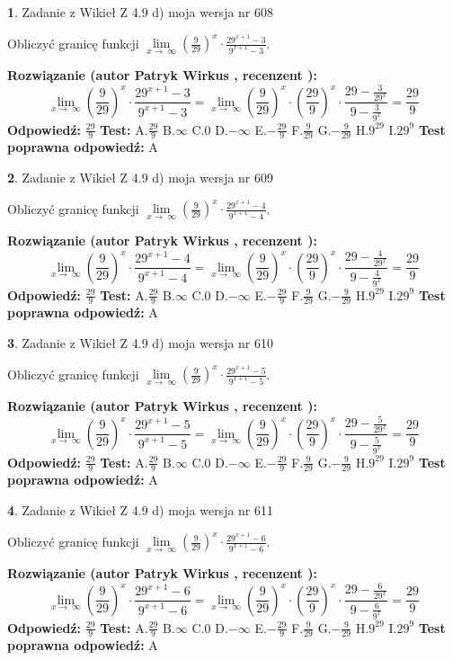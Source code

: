 \documentclass[12pt, a4paper]{article}
\theoremstyle{definition} %
\newtheorem{zad}{}
\newcommand{\zadStart}[1]{\begin{zad}#1\newline}
\newcommand{\zadStop}{\end{zad}}
\newcommand{\rozwStart}[2]{\noindent \textbf{Rozwiązanie (autor #1 , recenzent #2): }\newline}
\newcommand{\rozwStop}{\newline}
\newcommand{\odpStart}{\noindent \textbf{Odpowiedź:}\newline}
\newcommand{\odpStop}{\newline}
\newcommand{\testStart}{\noindent \textbf{Test:}\newline}
\newcommand{\testStop}{\newline}
\newcommand{\kluczStart}{\noindent \textbf{Test poprawna odpowiedź:}\newline}
\newcommand{\kluczStop}{\newline}
\begin{document}
\zadStart{Zadanie z Wikieł Z 4.9 d) moja wersja nr 608}


Obliczyć granicę funkcji  $\lim\limits_{x\to\ \infty}(\frac{9}{29})^{x}\cdot\frac{29^{x+1}-3}{9^{x+1}-3}$.
\zadStop
\rozwStart{Patryk Wirkus}{}
$$\lim\limits_{x\to\ \infty}(\frac{9}{29})^{x}\cdot\frac{29^{x+1}-3}{9^{x+1}-3}=\lim\limits_{x\to\ \infty}(\frac{9}{29})^{x}\cdot(\frac{29}{9})^{x} \cdot \frac{29-\frac{3}{29^{x}}}{9-\frac{3}{9^{x}}} = \frac{29}{9}$$
\rozwStop
\odpStart
$\frac{29}{9}$
\odpStop
\testStart
A.$\frac{29}{9}$ B.$\infty$ C.$0$ D.$-\infty$ E.$-\frac{29}{9}$
F.$\frac{9}{29}$ G.$-\frac{9}{29}$
H.$9^{29}$
I.$29^{9}$
\testStop
\kluczStart
A
\kluczStop



\zadStart{Zadanie z Wikieł Z 4.9 d) moja wersja nr 609}


Obliczyć granicę funkcji  $\lim\limits_{x\to\ \infty}(\frac{9}{29})^{x}\cdot\frac{29^{x+1}-4}{9^{x+1}-4}$.
\zadStop
\rozwStart{Patryk Wirkus}{}
$$\lim\limits_{x\to\ \infty}(\frac{9}{29})^{x}\cdot\frac{29^{x+1}-4}{9^{x+1}-4}=\lim\limits_{x\to\ \infty}(\frac{9}{29})^{x}\cdot(\frac{29}{9})^{x} \cdot \frac{29-\frac{4}{29^{x}}}{9-\frac{4}{9^{x}}} = \frac{29}{9}$$
\rozwStop
\odpStart
$\frac{29}{9}$
\odpStop
\testStart
A.$\frac{29}{9}$ B.$\infty$ C.$0$ D.$-\infty$ E.$-\frac{29}{9}$
F.$\frac{9}{29}$ G.$-\frac{9}{29}$
H.$9^{29}$
I.$29^{9}$
\testStop
\kluczStart
A
\kluczStop



\zadStart{Zadanie z Wikieł Z 4.9 d) moja wersja nr 610}


Obliczyć granicę funkcji  $\lim\limits_{x\to\ \infty}(\frac{9}{29})^{x}\cdot\frac{29^{x+1}-5}{9^{x+1}-5}$.
\zadStop
\rozwStart{Patryk Wirkus}{}
$$\lim\limits_{x\to\ \infty}(\frac{9}{29})^{x}\cdot\frac{29^{x+1}-5}{9^{x+1}-5}=\lim\limits_{x\to\ \infty}(\frac{9}{29})^{x}\cdot(\frac{29}{9})^{x} \cdot \frac{29-\frac{5}{29^{x}}}{9-\frac{5}{9^{x}}} = \frac{29}{9}$$
\rozwStop
\odpStart
$\frac{29}{9}$
\odpStop
\testStart
A.$\frac{29}{9}$ B.$\infty$ C.$0$ D.$-\infty$ E.$-\frac{29}{9}$
F.$\frac{9}{29}$ G.$-\frac{9}{29}$
H.$9^{29}$
I.$29^{9}$
\testStop
\kluczStart
A
\kluczStop



\zadStart{Zadanie z Wikieł Z 4.9 d) moja wersja nr 611}


Obliczyć granicę funkcji  $\lim\limits_{x\to\ \infty}(\frac{9}{29})^{x}\cdot\frac{29^{x+1}-6}{9^{x+1}-6}$.
\zadStop
\rozwStart{Patryk Wirkus}{}
$$\lim\limits_{x\to\ \infty}(\frac{9}{29})^{x}\cdot\frac{29^{x+1}-6}{9^{x+1}-6}=\lim\limits_{x\to\ \infty}(\frac{9}{29})^{x}\cdot(\frac{29}{9})^{x} \cdot \frac{29-\frac{6}{29^{x}}}{9-\frac{6}{9^{x}}} = \frac{29}{9}$$
\rozwStop
\odpStart
$\frac{29}{9}$
\odpStop
\testStart
A.$\frac{29}{9}$ B.$\infty$ C.$0$ D.$-\infty$ E.$-\frac{29}{9}$
F.$\frac{9}{29}$ G.$-\frac{9}{29}$
H.$9^{29}$
I.$29^{9}$
\testStop
\kluczStart
A
\kluczStop
\end{document}
